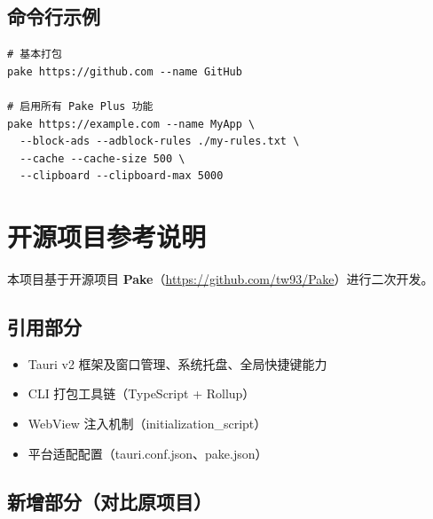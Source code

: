 \documentclass[12pt,a4paper]{ctexart}
\begin{document}
\subsection{命令行示例}

\begin{lstlisting}[caption=CLI 使用示例]
# 基本打包
pake https://github.com --name GitHub

# 启用所有 Pake Plus 功能
pake https://example.com --name MyApp \
  --block-ads --adblock-rules ./my-rules.txt \
  --cache --cache-size 500 \
  --clipboard --clipboard-max 5000
\end{lstlisting}

\section{开源项目参考说明}

本项目基于开源项目 \textbf{Pake}（\url{https://github.com/tw93/Pake}）进行二次开发。

\subsection{引用部分}

\begin{itemize}
  \item Tauri v2 框架及窗口管理、系统托盘、全局快捷键能力
  \item CLI 打包工具链（TypeScript + Rollup）
  \item WebView 注入机制（initialization\_script）
  \item 平台适配配置（tauri.conf.json、pake.json）
\end{itemize}

\subsection{新增部分（对比原项目）}
\end{document}
